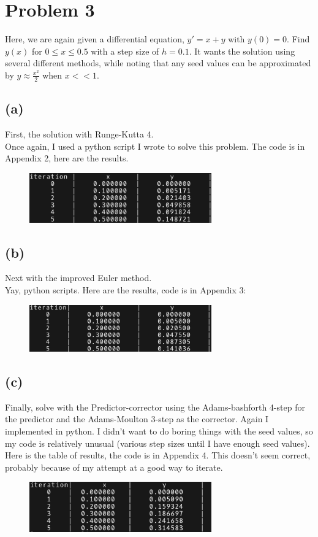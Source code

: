 \documentclass{article}
\begin{document}
\section*{Problem 3}
Here, we are again given a differential equation, $y'=x+y$ with $y(0)=0$. Find $y(x)$ for $0\leq x\leq 0.5$ with a step size of $h=0.1$. It wants the solution using several different methods, while noting that any seed values can be approximated by $y\approx \frac{x^2}{2}$ when $x<<1$.
\subsection*{(a)}
First, the solution with Runge-Kutta 4.\\
Once again, I used a python script I wrote to solve this problem. The code is in Appendix 2, here are the results.\\
\begin{figure}[h!]
    \centering
    \includegraphics[width=0.7\textwidth]{Prob31.png}
\end{figure}
\subsection*{(b)}
Next with the improved Euler method.\\
Yay, python scripts. Here are the results, code is in Appendix 3:
\begin{figure}[h!]
    \centering
    \includegraphics[width=0.7\textwidth]{Prob32.png}
\end{figure}
\subsection*{(c)}
Finally, solve with the Predictor-corrector using the Adams-bashforth 4-step for the predictor and the Adams-Moulton 3-step as the corrector. Again I implemented in python. I didn't want to do boring things with the seed values, so my code is relatively unusual (various step sizes until I have enough seed values). Here is the table of results, the code is in Appendix 4. This doesn't seem correct, probably because of my attempt at a good way to iterate.
\begin{figure}[h!]
    \centering
    \includegraphics[width=0.7\textwidth]{Prob33.png}
\end{figure}
\clearpage
\appendix
\end{document}
